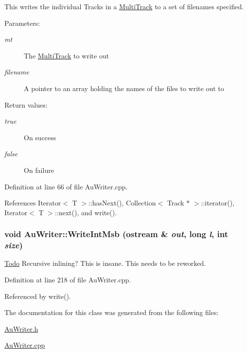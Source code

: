 This writes the individual Tracks in a \hyperlink{classMultiTrack}{Multi\-Track} to a set of filenames specified. \begin{Desc}
\item[Parameters:]
\begin{description}
\item[{\em mt}]The \hyperlink{classMultiTrack}{Multi\-Track} to write out \item[{\em filename}]A pointer to an array holding the names of the files to write out to \end{description}
\end{Desc}
\begin{Desc}
\item[Return values:]
\begin{description}
\item[{\em true}]On success \item[{\em false}]On failure \end{description}
\end{Desc}


Definition at line 66 of file Au\-Writer.cpp.

References Iterator$<$ T $>$::has\-Next(), Collection$<$ Track $\ast$ $>$::iterator(), Iterator$<$ T $>$::next(), and write().\hypertarget{classAuWriter_h1}{
\subsubsection[WriteIntMsb]{\setlength{\rightskip}{0pt plus 5cm}void Au\-Writer::Write\-Int\-Msb (ostream \& {\em out}, long {\em l}, int {\em size})}}
\label{classAuWriter_h1}


\begin{Desc}
\item[\hyperlink{todo__todo000003}{Todo}]Recursive inlining? This is insane. This needs to be reworked. \end{Desc}


Definition at line 218 of file Au\-Writer.cpp.

Referenced by write().

The documentation for this class was generated from the following files:\begin{CompactItemize}
\item 
\hyperlink{AuWriter_8h}{Au\-Writer.h}\item 
\hyperlink{AuWriter_8cpp}{Au\-Writer.cpp}\end{CompactItemize}

